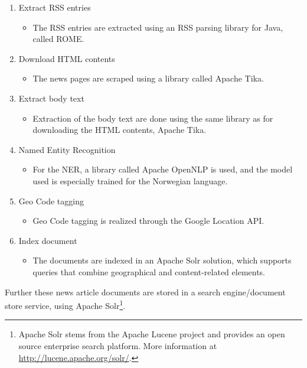 \begin{enumerate}
	\item Extract RSS entries
	\begin{itemize}
		\item The RSS entries are extracted using an RSS parsing library for Java, called ROME.
	\end{itemize}

	\item Download HTML contents
	\begin{itemize}
		\item The news pages are scraped using a library called Apache Tika.
	\end{itemize}
	
	\item Extract body text
	\begin{itemize}
		\item Extraction of the body text are done using the same library as for downloading the HTML contents, Apache Tika.
	\end{itemize}
	
	\item Named Entity Recognition
	\begin{itemize}
		\item For the NER, a library called Apache OpenNLP is used, and the model used is especially trained for the Norwegian language.
	\end{itemize}
	
	\item Geo Code tagging
	\begin{itemize}
		\item Geo Code tagging is realized through the Google Location API.
	\end{itemize}
	
	\item Index document
	\begin{itemize}
		\item The documents are indexed in an Apache Solr solution, which supports queries that combine geographical and content-related elements.
	\end{itemize}
	
\end{enumerate}

Further these news article documents are stored in a search engine/document store service, using Apache Solr\footnote{Apache Solr stems from the Apache Lucene project and provides an open source enterprise search platform. More information at \url{http://lucene.apache.org/solr/}.}.

